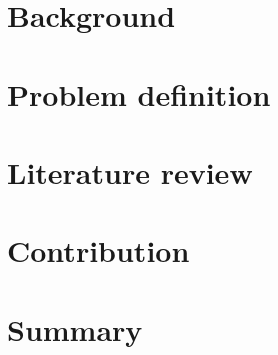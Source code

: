 \documentclass[english,12pt,a4paper,pdftex,sci,utf8]{aaltothesis}
\begin{document}
\thispagestyle{empty}


\clearpage

\section{Background}
\label{sec:background}




\clearpage

\section{Problem definition}
\label{sec:problem-definition}

\clearpage

\section{Literature review}
\label{sec:review}




\clearpage

\section{Contribution}
\label{sec:implementation}





\clearpage

\section{Summary} 
\label{sec:summary}

\clearpage





\end{document}
